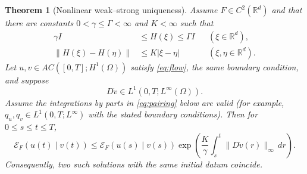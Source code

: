 \documentclass[11pt]{article}
\newtheorem{theorem}{Theorem}
\newcommand{\Om}{\Omega}
\newcommand{\R}{\mathbb R}
\newcommand{\Erel}{\mathcal E_F}
\begin{document}
\begin{theorem}[Nonlinear weak--strong uniqueness]\label{thm:main}
Assume $F\in C^2(\R^d)$ and that there are constants
$0<\gamma\le\Gamma<\infty$ and $K<\infty$ such that
\begin{align}
  \gamma I&\le H(\xi)\le\Gamma I
       &&(\xi\in\R^d), \label{eq:elliptic}\\
  \|H(\xi)-H(\eta)\|&\le K|\xi-\eta|
       &&(\xi,\eta\in\R^d). \label{eq:hesslip}
\end{align}
Let $u,v\in AC([0,T];H^1(\Om))$ satisfy \eqref{eq:flow}, the same boundary
condition, and suppose
\[
  D\dot v\in L^1(0,T;L^\infty(\Om)).
\]
Assume the integrations by parts in \eqref{eq:pairing} below are valid
(for example, $q_u,q_v\in L^1(0,T;L^\infty)$ with the stated boundary
conditions).  Then for $0\le s\le t\le T$,
\begin{equation}\label{eq:gronwall}
  \Erel(u(t)\mid v(t))
  \le \Erel(u(s)\mid v(s))
     \exp\!\left(\frac K\gamma
       \int_s^t\|D\dot v(r)\|_\infty\,dr\right).
\end{equation}
Consequently, two such solutions with the same initial datum coincide.
\end{theorem}
\end{document}
